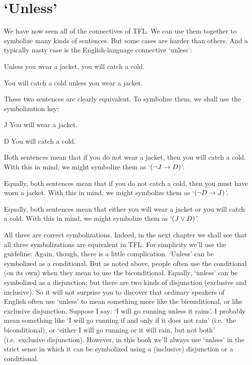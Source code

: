 \section{`Unless'}
We have now seen all of the connectives of TFL. We can use them together to symbolize many kinds of sentences. But some cases are harder than others. And a typically nasty case is the English-language connective `unless':
\begin{earg}
\item[\ex{unless1}] Unless you wear a jacket, you will catch a cold. 
\item[\ex{unless2}] You will catch a cold unless you wear a jacket. 
\end{earg}
These two sentences are clearly equivalent. To symbolize them, we shall use the symbolization key:
	\begin{ekey}
		\item[J] You will wear a jacket.
		\item[D] You will catch a cold.
	\end{ekey}
Both sentences mean that if you do not wear a jacket, then you will catch a cold. With this in mind, we might symbolize them as `$(\neg J \rightarrow D)$'. 

Equally, both sentences mean that if you do not catch a cold, then you must have worn a jacket. With this in mind, we might symbolize them as `$(\neg D \rightarrow J)$'.

Equally, both sentences mean that either you will wear a jacket or you will catch a cold. With this in mind, we might symbolize them as `$(J \vee D)$'.

All three are correct symbolizations. Indeed, in the next chapter we shall see that all three symbolizations are equivalent in TFL. For simplicity we'll use the guideline:
Again, though, there is a little complication. `Unless' can be symbolized as a conditional.  But as noted above, people often use the conditional (on its own) when they mean to use the biconditional. Equally, `unless' can be symbolized as a disjunction; but there are two kinds of disjunction (exclusive and inclusive). So it will not surprise you to discover that ordinary speakers of English often use `unless' to mean something more like the biconditional, or like exclusive disjunction. Suppose I say: `I will go running unless it rains'. I probably mean something like `I will go running if and only if it does not rain' (i.e.\ the biconditional), or  `either I will go running or it will rain, but not both' (i.e.\ exclusive disjunction). However, in this book we'll always use `unless' in the strict sense in which it can be symbolized using a (inclusive) disjunction or a conditional.


